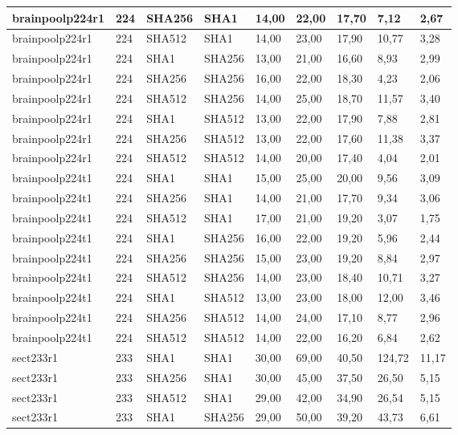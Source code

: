 \begin{longtable}{| l | l | l | l | l |l |l |l |l |}
brainpoolp224r1 & 224 & SHA256 & SHA1 & 14,00 & 22,00 & 17,70 & 7,12 & 2,67 \\ \hline 
brainpoolp224r1 & 224 & SHA512 & SHA1 & 14,00 & 23,00 & 17,90 & 10,77 & 3,28 \\ \hline 
brainpoolp224r1 & 224 & SHA1 & SHA256 & 13,00 & 21,00 & 16,60 & 8,93 & 2,99 \\ \hline 
brainpoolp224r1 & 224 & SHA256 & SHA256 & 16,00 & 22,00 & 18,30 & 4,23 & 2,06 \\ \hline 
brainpoolp224r1 & 224 & SHA512 & SHA256 & 14,00 & 25,00 & 18,70 & 11,57 & 3,40 \\ \hline 
brainpoolp224r1 & 224 & SHA1 & SHA512 & 13,00 & 22,00 & 17,90 & 7,88 & 2,81 \\ \hline 
brainpoolp224r1 & 224 & SHA256 & SHA512 & 13,00 & 22,00 & 17,60 & 11,38 & 3,37 \\ \hline 
brainpoolp224r1 & 224 & SHA512 & SHA512 & 14,00 & 20,00 & 17,40 & 4,04 & 2,01 \\ \hline 
brainpoolp224t1 & 224 & SHA1 & SHA1 & 15,00 & 25,00 & 20,00 & 9,56 & 3,09 \\ \hline 
brainpoolp224t1 & 224 & SHA256 & SHA1 & 14,00 & 21,00 & 17,70 & 9,34 & 3,06 \\ \hline 
brainpoolp224t1 & 224 & SHA512 & SHA1 & 17,00 & 21,00 & 19,20 & 3,07 & 1,75 \\ \hline 
brainpoolp224t1 & 224 & SHA1 & SHA256 & 16,00 & 22,00 & 19,20 & 5,96 & 2,44 \\ \hline 
brainpoolp224t1 & 224 & SHA256 & SHA256 & 15,00 & 23,00 & 19,20 & 8,84 & 2,97 \\ \hline 
brainpoolp224t1 & 224 & SHA512 & SHA256 & 14,00 & 23,00 & 18,40 & 10,71 & 3,27 \\ \hline 
brainpoolp224t1 & 224 & SHA1 & SHA512 & 13,00 & 23,00 & 18,00 & 12,00 & 3,46 \\ \hline 
brainpoolp224t1 & 224 & SHA256 & SHA512 & 14,00 & 24,00 & 17,10 & 8,77 & 2,96 \\ \hline 
brainpoolp224t1 & 224 & SHA512 & SHA512 & 14,00 & 22,00 & 16,20 & 6,84 & 2,62 \\ \hline 
sect233r1 & 233 & SHA1 & SHA1 & 30,00 & 69,00 & 40,50 & 124,72 & 11,17 \\ \hline 
sect233r1 & 233 & SHA256 & SHA1 & 30,00 & 45,00 & 37,50 & 26,50 & 5,15 \\ \hline 
sect233r1 & 233 & SHA512 & SHA1 & 29,00 & 42,00 & 34,90 & 26,54 & 5,15 \\ \hline 
sect233r1 & 233 & SHA1 & SHA256 & 29,00 & 50,00 & 39,20 & 43,73 & 6,61 \\ \hline 

\end{longtable}
